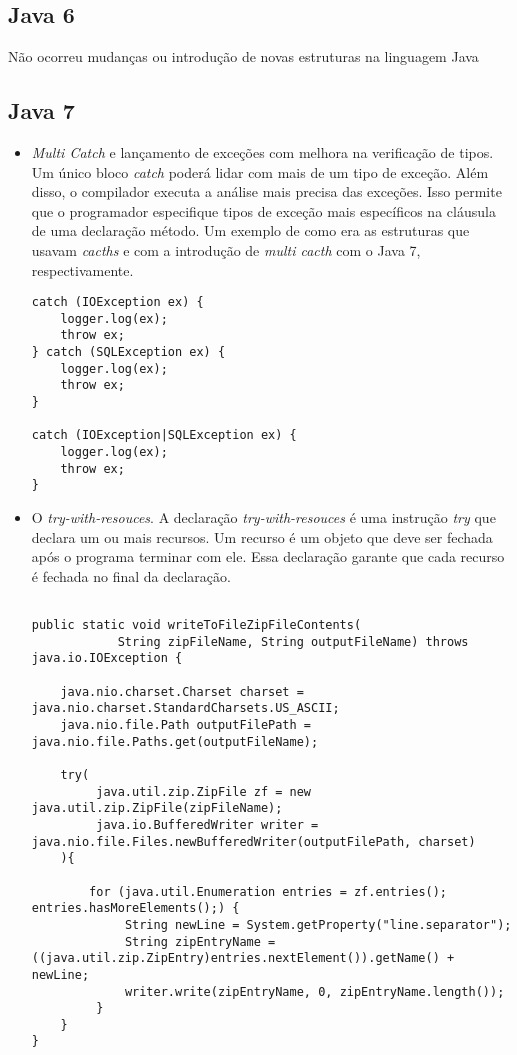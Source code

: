  
  
	\subsection {Java 6}
		Não ocorreu mudanças ou introdução de novas estruturas na linguagem Java
	
	\subsection {Java 7}
		\begin{itemize}
		  \item {\it Multi Catch} e lançamento de exceções com melhora na verificação de tipos. Um único bloco {\it catch} poderá lidar com mais de um tipo de exceção. Além disso, o compilador executa a análise mais precisa das exceções. Isso permite que o programador especifique tipos de exceção mais específicos na cláusula de uma declaração método. Um exemplo de como era as estruturas que usavam {\it cacths} e com a introdução de {\it multi cacth} com o Java 7, respectivamente.
  
 \clearpage
\begin{lstlisting}
catch (IOException ex) {
	logger.log(ex);
	throw ex;
} catch (SQLException ex) {
	logger.log(ex);
	throw ex;
}

catch (IOException|SQLException ex) {
	logger.log(ex);
	throw ex;
}
\end{lstlisting}
  
		  \item O {\it try-with-resouces}. A declaração {\it try-with-resouces} é uma instrução {\it try} que declara um ou mais recursos. Um recurso é um objeto que deve ser fechada após o programa terminar com ele. Essa declaração garante que cada recurso é fechada no final da declaração.
	 
\begin{lstlisting}

public static void writeToFileZipFileContents(
			String zipFileName, String outputFileName) throws java.io.IOException {
	
	java.nio.charset.Charset charset = java.nio.charset.StandardCharsets.US_ASCII;
	java.nio.file.Path outputFilePath = java.nio.file.Paths.get(outputFileName);
	
	try(
		 java.util.zip.ZipFile zf = new java.util.zip.ZipFile(zipFileName);
		 java.io.BufferedWriter writer = java.nio.file.Files.newBufferedWriter(outputFilePath, charset)
	){
	
		for (java.util.Enumeration entries = zf.entries(); entries.hasMoreElements();) {
			 String newLine = System.getProperty("line.separator");
			 String zipEntryName = ((java.util.zip.ZipEntry)entries.nextElement()).getName() + newLine;
			 writer.write(zipEntryName, 0, zipEntryName.length());
		 }
	}
}


\end{lstlisting}
\end{itemize}
